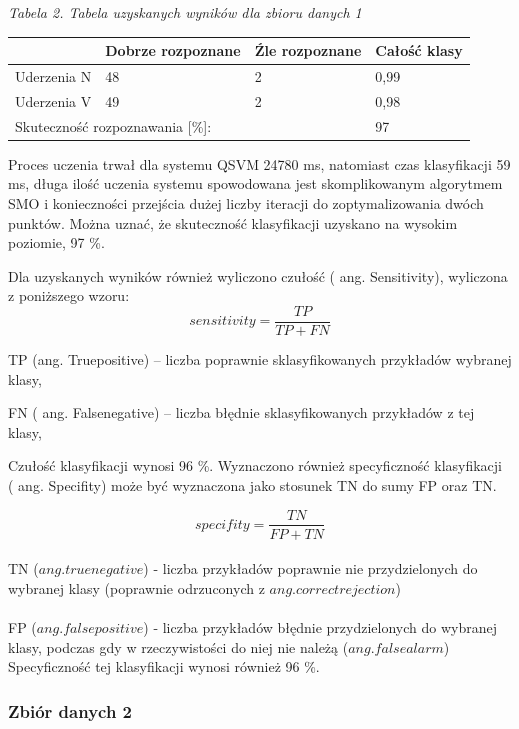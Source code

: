 \documentclass[[10pt,a4paper]{article}
\begin{document}
\begin{enumerate}
\textit{Tabela 2. Tabela uzyskanych wyników dla zbioru danych 1}
\newline
\begin{tabular}{|p{1.1in}|p{1.1in}|p{1.1in}|p{1.1in}|} \hline 
 & Dobrze rozpoznane & \'{Z}le rozpoznane & Całość klasy  \\ \hline 
Uderzenia N & 48 & 2 & 0,99 \\ \hline 
Uderzenia V & 49 & 2 & 0,98 \\ \hline 
\multicolumn{3}{|p{1in}|}{Skuteczność rozpoznawania [\%]:} & 97 \\ \hline 
\end{tabular}



\noindent Proces uczenia trwał dla systemu QSVM 24780 ms, natomiast czas klasyfikacji 59 ms, długa ilość uczenia systemu spowodowana jest skomplikowanym algorytmem SMO i konieczności przejścia dużej liczby iteracji do zoptymalizowania dwóch punktów. Można uznać, że skuteczność klasyfikacji uzyskano na wysokim poziomie, 97 \%. 

\noindent Dla uzyskanych wyników również wyliczono czułość ( ang. Sensitivity), wyliczona z poniższego wzoru:
 $$
sensitivity = \frac{TP}{TP + FN}
$$

\noindent TP (ang. Truepositive) -- liczba poprawnie sklasyfikowanych przykładów wybranej klasy,

\noindent FN ( ang. Falsenegative) -- liczba błędnie sklasyfikowanych przykładów z tej klasy,

\noindent Czułość klasyfikacji wynosi 96 \%. Wyznaczono również specyficzność klasyfikacji ( ang. Specifity) może być wyznaczona jako stosunek TN do sumy FP oraz TN.

 $$
specifity = \frac{TN}{FP + TN}
$$
\\
TN ($ang. true negative$) - liczba przykładów poprawnie nie przydzielonych do wybranej klasy (poprawnie odrzuconych z $ang. correct rejection$)\\
\\
FP ($ang. false positive$) - liczba przykładów błędnie przydzielonych do wybranej klasy, podczas gdy w rzeczywistości do niej nie należą ($ang. false alarm$)\\

\noindent Specyficzność tej klasyfikacji wynosi również 96 \%. 

\subsubsection{Zbiór danych 2} 


\end{enumerate}
\end{document}
